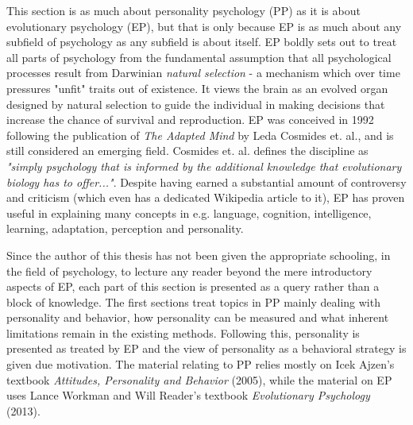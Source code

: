This section is as much about personality psychology (PP) as it is about evolutionary psychology (EP), but that is only because EP is as much about any subfield of psychology as any subfield is about itself. EP boldly sets out to treat all parts of psychology from the fundamental assumption that all psychological processes result from Darwinian \textit{natural selection} - a mechanism which over time pressures "unfit" traits out of existence. It views the brain as an evolved organ designed by natural selection to guide the individual in making decisions that increase the chance of survival and reproduction. EP was conceived in 1992 following the publication of \textit{The Adapted Mind} by Leda Cosmides et. al., and is still considered an emerging field. Cosmides et. al. defines the discipline as \textit{"simply psychology that is informed by the additional knowledge that evolutionary biology has to offer..."}. Despite having earned a substantial amount of controversy and criticism (which even has a dedicated Wikipedia article to it), EP has proven useful in explaining many concepts in e.g. language, cognition, intelligence, learning, adaptation, perception and personality.

Since the author of this thesis has not been given the appropriate schooling, in the field of psychology, to lecture any reader beyond the mere introductory aspects of EP, each part of this section is presented as a query rather than a block of knowledge. The first sections treat topics in PP mainly dealing with personality and behavior, how personality can be measured and what inherent limitations remain in the existing methods. Following this, personality is presented as treated by EP and the view of personality as a behavioral strategy is given due motivation. The material relating to PP relies mostly on Icek Ajzen's textbook \textit{Attitudes, Personality and Behavior} (2005), while the material on EP uses Lance Workman and Will Reader's textbook \textit{Evolutionary Psychology} (2013).



